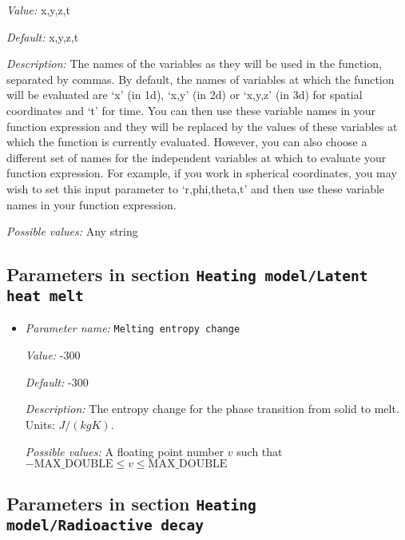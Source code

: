 \begin{itemize}
{\it Value:} x,y,z,t


{\it Default:} x,y,z,t


{\it Description:} The names of the variables as they will be used in the function, separated by commas. By default, the names of variables at which the function will be evaluated are `x' (in 1d), `x,y' (in 2d) or `x,y,z' (in 3d) for spatial coordinates and `t' for time. You can then use these variable names in your function expression and they will be replaced by the values of these variables at which the function is currently evaluated. However, you can also choose a different set of names for the independent variables at which to evaluate your function expression. For example, if you work in spherical coordinates, you may wish to set this input parameter to `r,phi,theta,t' and then use these variable names in your function expression.


{\it Possible values:} Any string
\end{itemize}

\subsection{Parameters in section \tt Heating model/Latent heat melt}
\label{parameters:Heating_20model/Latent_20heat_20melt}

\begin{itemize}
\item {\it Parameter name:} {\tt Melting entropy change}
\label{parameters:Heating model/Latent heat melt/Melting entropy change}
\label{parameters:Heating_20model/Latent_20heat_20melt/Melting_20entropy_20change}


{\it Value:} -300


{\it Default:} -300


{\it Description:} The entropy change for the phase transition from solid to melt. Units: $J/(kg K)$.


{\it Possible values:} A floating point number $v$ such that $-\text{MAX\_DOUBLE} \leq v \leq \text{MAX\_DOUBLE}$
\end{itemize}

\subsection{Parameters in section \tt Heating model/Radioactive decay}
\label{parameters:Heating_20model/Radioactive_20decay}

